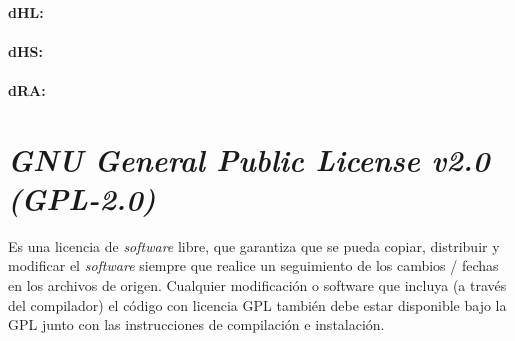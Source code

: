 \paragraph{dHL:}
\paragraph{dHS:}
\paragraph{dRA:}


\section{\textit{GNU General Public License v2.0 (GPL-2.0) }}

	Es una licencia de \textit{software} libre, que garantiza que se pueda copiar, distribuir y modificar el \textit{software} siempre que realice un seguimiento de los cambios / fechas en los archivos de origen. Cualquier modificaci\'on o software que incluya (a trav\'es del compilador) el c\'odigo con licencia GPL tambi\'en debe estar disponible bajo la GPL junto con las instrucciones de compilaci\'on e instalaci\'on.